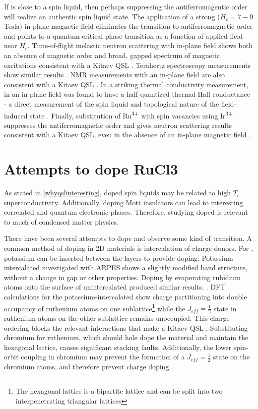 If \rucl is close to a spin liquid, then perhaps suppressing the antiferromagentic order will realize an authentic spin liquid state. 	The application of a strong ($H_{c} = 7-9$ Tesla) in-plane magnetic field eliminates the transition to antiferromagnetic order and points to a quantum critical phase transition as a function of applied field near $H_{c}$. Time-of-flight inelastic neutron scattering with in-plane field shows both an absence of magnetic order and broad, gapped spectrum of magnetic excitations consistent with a Kitaev QSL \cite{Banerjee2017}. Terahertz spectroscopy measurements show similar results \cite{Wang2017}. NMR measurements with an in-plane field are also consistent with a Kitaev QSL \cite{Baek2017}. In a striking thermal conductivity measurement, \rucl in an in-plane field was found to have a half-quantized thermal Hall conductance - a direct measurement of the spin liquid and topological nature of the field-induced state \cite{Kasahara2018}. Finally, substitution of Ru\textsuperscript{3+} with spin vacancies using Ir\textsuperscript{3+} suppresses the antiferromagnetic order and gives neutron scattering results consistent with a Kitaev QSL, even in the absence of an in-plane magnetic field \cite{Lampen-Kelley2017}.

\section{Attempts to dope RuCl3}
As stated in \ref{whyqslinteresting}, doped spin liquids may be related to high $T_{c}$ superconductivity. Additionally, doping Mott insulators can lead to interesting correlated and quantum electronic phases. Therefore, studying doped \rucl is relevant to much of condensed matter physics.

There have been several attempts to dope \rucl and observe some kind of transition. A common method of doping in 2D materials is intercalation of charge donors. For \ruclnospace , potassium can be inserted between the layers to provide doping. Potassium-intercalated \rucl investigated with ARPES shows a slightly modified band structure, without a change in gap or other properties. Doping by evaporating rubidium atoms onto the surface of unintercalated \rucl produced similar results. \cite{Zhou2016}. DFT calculations for the potassium-intercalated \rucl show charge partitioning into double occupancy of ruthenium atoms on one sublattice\footnote{The hexagonal lattice is a bipartite lattice and can be split into two interpenetrating triangular lattices} while the $J_{eff} = \frac{1}{2}$ state in ruthenium atoms on the other sublattice remains unoccupied. This charge ordering blocks the relevant interactions that make \rucl a Kitaev QSL \cite{Koitzsch2017}. Substituting chromium for ruthenium, which should hole dope the material and maintain the hexagonal lattice, causes significant stacking faults. Additionally, the lower spin-orbit coupling in chromium \cite{Fisk1968} may prevent the formation of a $J_{eff} = \frac{1}{2}$ state on the chromium atoms, and therefore prevent charge doping \cite{Roslova2019}.

